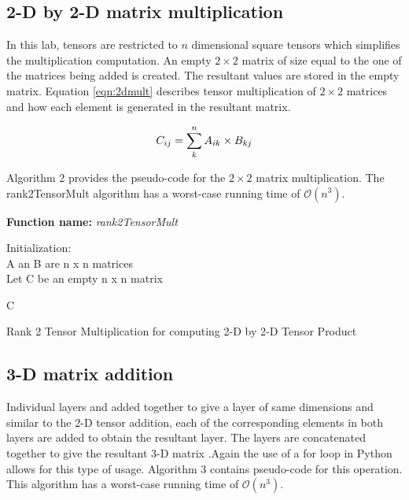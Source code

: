 \documentclass[10pt,journal]{article}
\begin{document}
\subsection{2-D by 2-D matrix multiplication}
In this lab, tensors are restricted to $n$ dimensional square tensors which simplifies the multiplication computation. An empty  $2\times 2$ matrix of size equal to the one of the matrices being added is created. The resultant values are stored in the empty matrix. Equation \ref{eqn:2dmult} describes tensor multiplication of  $2\times 2$ matrices and how each element is generated in the resultant matrix.

\begin{equation}
    \Large{C_{ij}=\sum_k^n{A_{ik}\times B_{kj}}}
    \label{eqn:2dmult}
\end{equation}

Algorithm 2 provides the pseudo-code for the $2\times 2$ matrix multiplication.
The rank2TensorMult algorithm has a worst-case running time of $\mathcal{O}(n^3)$.
\newline 
\begin{algorithm}[H]
\SetAlgoLined
\textbf{Function name:} \emph{rank2TensorMult}

 Initialization\::\\ 
  A an B are n x n matrices\\
  Let C be an empty n x n matrix
 
  {
    }
 
 \Return C
 
\caption{Rank 2 Tensor Multiplication for computing 2-D by 2-D Tensor Product}
\end{algorithm}

\subsection{3-D matrix addition}

Individual layers and added together to give a layer of same dimensions and similar to the 2-D tensor addition, each of the corresponding elements in both layers are added to obtain the resultant layer. The layers are concatenated together to give the resultant 3-D matrix  .Again the use of a for loop in Python allows for this type of usage. Algorithm 3 contains pseudo-code for this operation. This algorithm has a worst-case running time of $\mathcal{O}(n^3)$.
\end{document}

